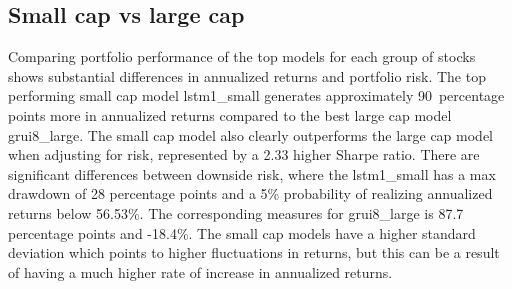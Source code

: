 \subsection{Small cap vs large cap}
\begin{table}[ht]
\centering
{}
\caption{Comparing trading performance (long, K=5)}
\end{table}
\begin{table}[ht]
\centering
{}
\caption{Top performing model for small and large cap (long, K=5)}
\end{table}
\indent\newline 
Comparing portfolio performance of the top models for each group of stocks shows substantial differences in annualized returns and portfolio risk. The top performing small cap model lstm1\_small generates approximately 90\ percentage points more in annualized returns compared to the best large cap model grui8\_large. The small cap model also clearly outperforms the large cap model when adjusting for risk, represented by a 2.33 higher Sharpe ratio. There are significant differences between downside risk, where the lstm1\_small has a max drawdown of 28 percentage points and a 5\% probability of realizing annualized returns below 56.53\%. The corresponding measures for grui8\_large is 87.7 percentage points and -18.4\%. The small cap models have a higher standard deviation which points to higher fluctuations in returns, but this can be a result of having a much higher rate of increase in annualized returns. 

